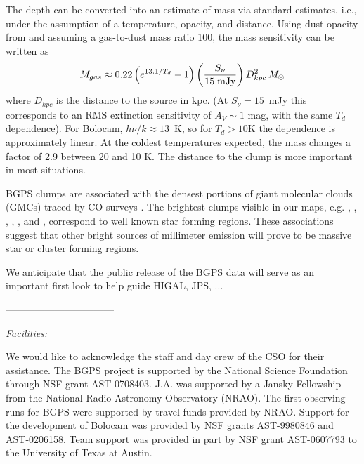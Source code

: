 \documentclass{emulateapj}
\def\msol{\ifmmode {\>M_\odot}\else {$M_\odot$}\fi}
\begin{document}
The depth can be converted into an estimate of mass via standard
estimates, i.e., under the assumption of a temperature, opacity, and
distance.  Using dust opacity from \citet{ossenkopf94}
and assuming a gas-to-dust mass ratio 100, the mass sensitivity
can be written as
\begin{equation} 
\label{eq:Mass}
M_{gas}\approx
0.22\left( e^{13.1/T_d}-1 \right) \left({S_\nu\over 15\; {\rm mJy}} \right)
D^{2}_{kpc} \msol 
\end{equation}
where $D_{kpc}$ is the distance to the source in kpc.  (At $S_\nu =
15$~mJy this corresponds to an RMS extinction sensitivity of $A_V\sim
1$ mag, with the same $T_d$ dependence).  For Bolocam, $h\nu/k \approx
13$~K, so for $T_d > 10$K the dependence is approximately linear.  At
the coldest temperatures expected, the mass changes a factor of 2.9
between 20 and 10 K.  The distance to the clump is more important in most
situations.

BGPS clumps are associated with the densest portions of giant
molecular clouds (GMCs) traced by CO surveys
\citep[e.g.,][]{dame01,jackson06}.  The brightest clumps visible in
our maps, e.g. , , ,
, , and , correspond to well
known star forming regions.
These associations suggest that other bright sources of millimeter
emission will prove to be massive star or cluster forming regions.

We anticipate that the public release of the BGPS data will serve as
an important first look to help guide HIGAL, JPS, ...

\noindent---------------------------------

{\it Facilities:} 

\acknowledgments

We would like to acknowledge the staff and day crew of the CSO for their
assistance. The BGPS project is supported by the National Science Foundation
through NSF grant AST-0708403. J.A. was supported by a Jansky Fellowship from
the National Radio Astronomy Observatory (NRAO). The first observing runs for
BGPS were supported by travel funds provided by NRAO. Support for the
development of Bolocam was provided by NSF grants AST-9980846 and AST-0206158.
Team support was provided in part by NSF grant AST-0607793 to the
University of Texas at Austin.
\end{document}
